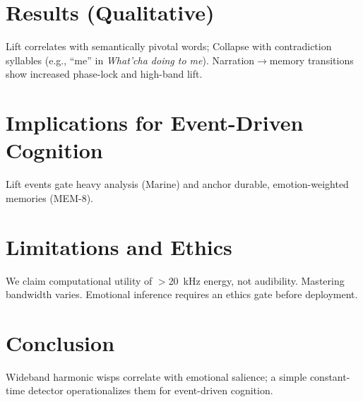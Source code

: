 \documentclass[conference]{IEEEtran}
\begin{document}
\section{Results (Qualitative)}
Lift correlates with semantically pivotal words; Collapse with contradiction syllables (e.g., ``me'' in \emph{What'cha doing to me}). Narration$\rightarrow$memory transitions show increased phase-lock and high-band lift.

\section{Implications for Event-Driven Cognition}
Lift events gate heavy analysis (Marine) and anchor durable, emotion-weighted memories (MEM-8).

\section{Limitations and Ethics}
We claim computational utility of $>$\SI{20}{\kilo\hertz} energy, not audibility. Mastering bandwidth varies. Emotional inference requires an ethics gate before deployment.

\section{Conclusion}
Wideband harmonic wisps correlate with emotional salience; a simple constant-time detector operationalizes them for event-driven cognition.






\end{document}
